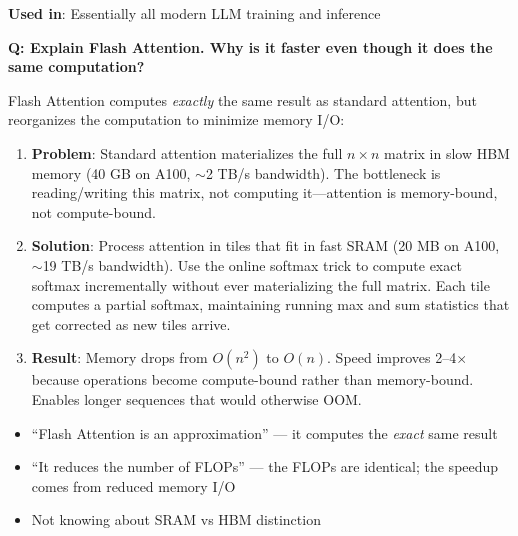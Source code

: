 \textbf{Used in}: Essentially all modern LLM training and inference

\begin{interviewq}
\textbf{Q: Explain Flash Attention. Why is it faster even though it does the same computation?}

 \quad {} \quad \badgefreq{\freqhigh}

\stronganswer Flash Attention computes \textit{exactly} the same result as standard attention, but reorganizes the computation to minimize memory I/O:

\begin{enumerate}
    \item \textbf{Problem}: Standard attention materializes the full $n \times n$ matrix in slow HBM memory (40 GB on A100, $\sim$2 TB/s bandwidth). The bottleneck is reading/writing this matrix, not computing it---attention is memory-bound, not compute-bound.
    \item \textbf{Solution}: Process attention in tiles that fit in fast SRAM (20 MB on A100, $\sim$19 TB/s bandwidth). Use the online softmax trick to compute exact softmax incrementally without ever materializing the full matrix. Each tile computes a partial softmax, maintaining running max and sum statistics that get corrected as new tiles arrive.
    \item \textbf{Result}: Memory drops from $O(n^2)$ to $O(n)$. Speed improves 2--4$\times$ because operations become compute-bound rather than memory-bound. Enables longer sequences that would otherwise OOM.
\end{enumerate}

\redflags
\begin{itemize}
    \item ``Flash Attention is an approximation'' --- it computes the \textit{exact} same result
    \item ``It reduces the number of FLOPs'' --- the FLOPs are identical; the speedup comes from reduced memory I/O
    \item Not knowing about SRAM vs HBM distinction
\end{itemize}



\end{interviewq}
